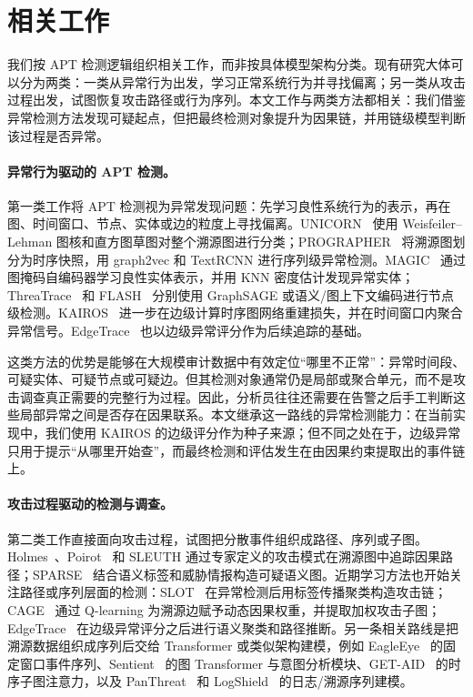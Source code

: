 \section{相关工作}
\label{sec:related}

我们按 APT 检测逻辑组织相关工作，而非按具体模型架构分类。现有研究大体可以分为两类：一类从异常行为出发，学习正常系统行为并寻找偏离；另一类从攻击过程出发，试图恢复攻击路径或行为序列。本文工作与两类方法都相关：我们借鉴异常检测方法发现可疑起点，但把最终检测对象提升为因果链，并用链级模型判断该过程是否异常。

\paragraph{异常行为驱动的 APT 检测。}

第一类工作将 APT 检测视为异常发现问题：先学习良性系统行为的表示，再在图、时间窗口、节点、实体或边的粒度上寻找偏离。UNICORN~\cite{unicorn2020} 使用 Weisfeiler--Lehman 图核和直方图草图对整个溯源图进行分类；PROGRAPHER~\cite{yang2023prographer} 将溯源图划分为时序快照，用 graph2vec 和 TextRCNN 进行序列级异常检测。MAGIC~\cite{jia2024magic} 通过图掩码自编码器学习良性实体表示，并用 KNN 密度估计发现异常实体；ThreaTrace~\cite{wang2022threatrace} 和 FLASH~\cite{flash2024} 分别使用 GraphSAGE 或语义/图上下文编码进行节点级检测。KAIROS~\cite{cheng2024kairos} 进一步在边级计算时序图网络重建损失，并在时间窗口内聚合异常信号。EdgeTrace~\cite{edgetrace2025} 也以边级异常评分作为后续追踪的基础。

这类方法的优势是能够在大规模审计数据中有效定位“哪里不正常”：异常时间段、可疑实体、可疑节点或可疑边。但其检测对象通常仍是局部或聚合单元，而不是攻击调查真正需要的完整行为过程。因此，分析员往往还需要在告警之后手工判断这些局部异常之间是否存在因果联系。本文继承这一路线的异常检测能力：在当前实现中，我们使用 KAIROS 的边级评分作为种子来源；但不同之处在于，边级异常只用于提示“从哪里开始查”，而最终检测和评估发生在由因果约束提取出的事件链上。

\paragraph{攻击过程驱动的检测与调查。}

第二类工作直接面向攻击过程，试图把分散事件组织成路径、序列或子图。Holmes~\cite{holmes2019}、Poirot~\cite{poirot2019} 和 SLEUTH 通过专家定义的攻击模式在溯源图中追踪因果路径；SPARSE~\cite{sparse2024} 结合语义标签和威胁情报构造可疑语义图。近期学习方法也开始关注路径或序列层面的检测：SLOT~\cite{slot2025} 在异常检测后用标签传播聚类构造攻击链；CAGE~\cite{cage2025} 通过 Q-learning 为溯源边赋予动态因果权重，并提取加权攻击子图；EdgeTrace~\cite{edgetrace2025} 在边级异常评分之后进行语义聚类和路径推断。另一条相关路线是把溯源数据组织成序列后交给 Transformer 或类似架构建模，例如 EagleEye~\cite{eagleeye2024} 的固定窗口事件序列、Sentient~\cite{sentient2026} 的图 Transformer 与意图分析模块、GET-AID~\cite{getaid2025} 的时序子图注意力，以及 PanThreat~\cite{panthreat2025} 和 LogShield~\cite{logshield2024} 的日志/溯源序列建模。

